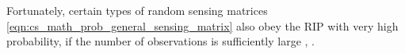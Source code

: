 Fortunately,
certain types of
random sensing matrices
\eqref{eqn:cs_math_prob_general_sensing_matrix} also obey
the \ac{RIP} with
very high probability, if
the number of
observations is
sufficiently large
\cite[6]{book:Foucart2013},
\cite{article:TroppPIEEE2010}.
